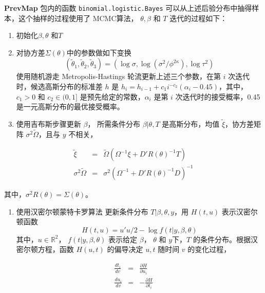 \documentclass[12pt,a4paper,UTF8,twoside]{book}
\providecommand{\tightlist}{%
  \setlength{\itemsep}{0pt}\setlength{\parskip}{0pt}}
\theoremstyle{definition}
\theoremstyle{definition}
\theoremstyle{definition}
\theoremstyle{remark}
\begin{document}
\textbf{PrevMap} 包内的函数 \texttt{binomial.logistic.Bayes}
可以从上述后验分布中抽得样本，这个抽样的过程使用了 MCMC算法，
\(\theta, \beta\) 和 \(T\) 迭代的过程如下：

\begin{enumerate}
\def\labelenumi{\arabic{enumi}.}
\tightlist
\item
  初始化\(\beta, \theta\) 和\(T\)
\item
  对协方差\(\Sigma(\theta)\)中的参数做如下变换\citep{Christensen2006}
  \[(\tilde{\theta}_{1}, \tilde{\theta}_{2}, \tilde{\theta}_{3}) = (\log \sigma, \log (\sigma^2/\phi^{2\kappa}), \log \tau^2)\]
  使用随机游走 Metropolis-Hastings 轮流更新上述三个参数，在第 \(i\)
  次迭代时，候选高斯分布的标准差 \(h\) 是
  \(h_{i} = h_{i-1} + c_{1}i^{-c_{2}}(\alpha_{i}-0.45)\)，其中，\(c_{1} > 0\)
  和 \(c_{2} \in (0,1]\) 是预先给定的常数，\(\alpha_i\) 是第 \(i\)
  次迭代时的接受概率，0.45 是一元高斯分布的最优接受概率。
\item
  使用吉布斯步骤更新 \(\beta\)， 所需条件分布 \(\beta|\theta,T\)
  是高斯分布，均值 \(\tilde{\xi}\)，协方差矩阵
  \(\sigma^2\tilde{\Omega}\)，且与 \(y\) 不相关，
\end{enumerate}

\begin{eqnarray*}
\tilde{\xi} & = & \tilde{\Omega}(\Omega^{-1}\xi+D' R(\theta)^{-1} T) \\
\sigma^2 \tilde{\Omega} & = & \sigma^2(\Omega^{-1} + D' R(\theta)^{-1} D)^{-1}
\end{eqnarray*}

\noindent 其中，\(\sigma^2 R(\theta) = \Sigma(\theta)\)。

\begin{enumerate}
\def\labelenumi{\arabic{enumi}.}
\setcounter{enumi}{3}
\tightlist
\item
  使用汉密尔顿蒙特卡罗算法 \citep{Brooks2011} 更新条件分布
  \(T|\beta,\theta,y\)，用 \(H(t,u)\) 表示汉密尔顿函数
  \[H(t, u) = u' u/2 - \log f(t | y, \beta, \theta)\]
  \noindent 其中，\(u\in\mathbb{R}^2\)， \(f(t | y, \beta, \theta)\)
  表示给定 \(\beta\)， \(\theta\) 和 \(y\)下，\(T\)
  的条件分布。根据汉密尔顿方程，函数 \(H(u, t)\) 的偏导决定 \(u,t\)
  随时间 \(v\) 的变化过程，
\end{enumerate}

\begin{eqnarray*}
\frac{d t_{i}}{d v} & = & \frac{\partial H}{\partial u_{i}} \\
\frac{d u_{i}}{d v} & = & -\frac{\partial H}{\partial t_{i}}
\end{eqnarray*}
\end{document}
